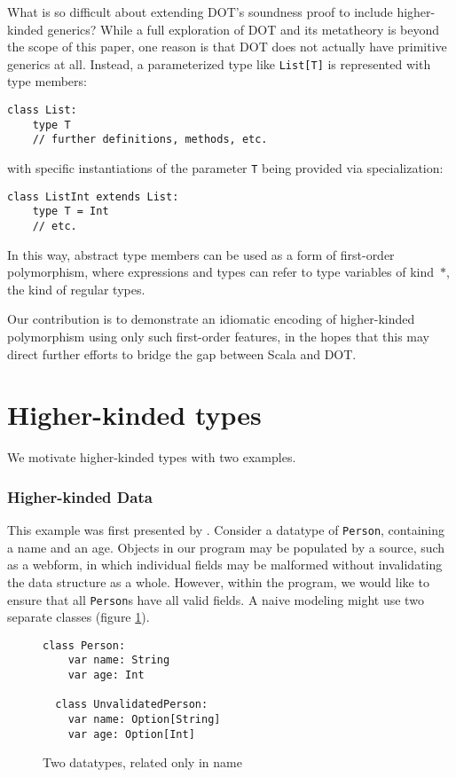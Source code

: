\documentclass[acmsmall,screen]{acmart}
\begin{document}
What is so difficult about extending DOT's soundness proof to include
higher-kinded generics? While a full exploration of DOT and its metatheory is
beyond the scope of this paper, one reason is that DOT does not actually have
primitive generics at all. Instead, a parameterized type like \texttt{List[T]}
is represented with type members:
\begin{lstlisting}[style=scala]
  class List:
    type T
    // further definitions, methods, etc.
\end{lstlisting}

with specific instantiations of the parameter \texttt{T} being provided via
specialization:
\begin{lstlisting}[style=scala]
  class ListInt extends List:
    type T = Int
    // etc.
\end{lstlisting}

In this way, abstract type members can be used as a form of first-order
polymorphism, where expressions and types can refer to type variables of
kind~$*$, the kind of regular types.

Our contribution is to demonstrate an idiomatic encoding of higher-kinded
polymorphism using only such first-order features, in the hopes that this may
direct further efforts to bridge the gap between Scala and DOT.

\section{Higher-kinded types}

We motivate higher-kinded types with two examples.

\subsubsection*{Higher-kinded Data}

This example was first presented by \cite{macguire_hkd}. Consider a datatype of
\texttt{Person}, containing a name and an age. Objects in our program may be
populated by a source, such as a webform, in which individual fields may be
malformed without invalidating the data structure as a whole. However, within
the program, we would like to ensure that all \texttt{Person}s have all valid
fields. A naive modeling might use two separate classes (figure
\ref{fig::person-bad}).

\begin{figure}[ht]
  \begin{lstlisting}[style=scala]
  class Person:
    var name: String
    var age: Int

  class UnvalidatedPerson:
    var name: Option[String]
    var age: Option[Int]
  \end{lstlisting}
  \caption{Two datatypes, related only in name}\label{fig::person-bad}
\end{figure}
\end{document}
